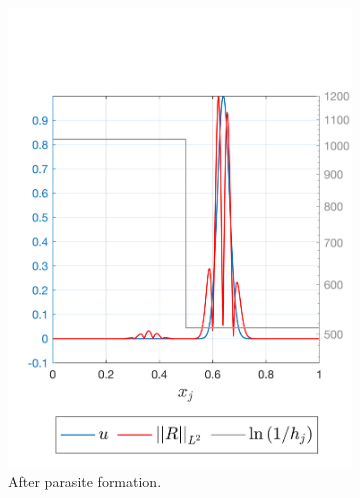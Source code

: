 \documentclass[final]{amsart}
\numberwithin{equation}{section}
\begin{document}
\begin{figure}[H]
\begin{subfigure}[b]{.3\textwidth}
		\includegraphics[width=\textwidth]{../figures/fig_CNCS_4000_para_1_legend}	
		\caption{\label{fig:CNCS_parasite_1D_2}
			After parasite formation.
		}
	\end{subfigure}
	\begin{subfigure}[b]{.3\textwidth}

\end{subfigure}
\end{figure}
\end{document}
